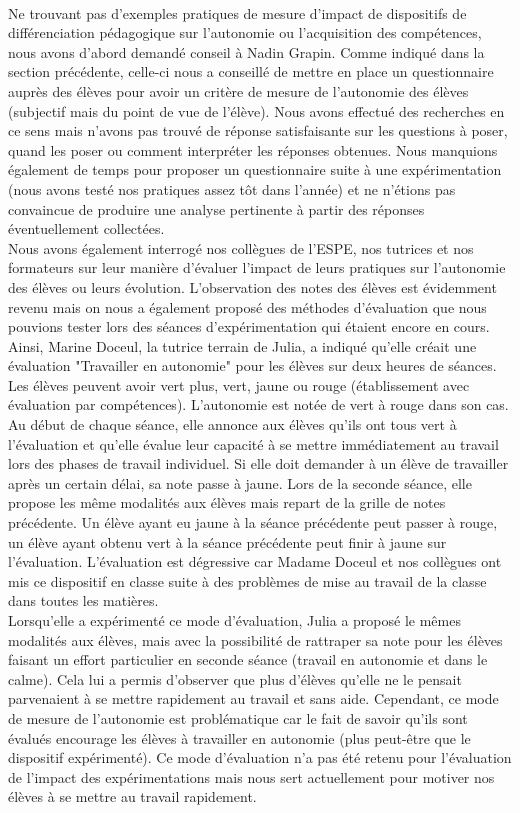 \paragraph*{} Ne trouvant pas d'exemples pratiques de mesure d'impact de dispositifs de différenciation pédagogique sur l'autonomie ou l'acquisition des compétences, nous avons d'abord demandé conseil à Nadin Grapin. Comme indiqué dans la section précédente, celle-ci nous a conseillé de mettre en place un questionnaire auprès des élèves pour avoir un critère de mesure  de l'autonomie des élèves (subjectif mais du point de vue de l'élève). Nous avons effectué des recherches en ce sens mais n'avons pas trouvé de réponse satisfaisante sur les questions à poser, quand les poser ou comment interpréter les réponses obtenues. Nous manquions également de temps pour proposer un questionnaire suite à une expérimentation (nous avons testé nos pratiques assez tôt dans l'année) et ne n'étions pas convaincue de produire une analyse pertinente à partir des réponses éventuellement collectées.\\
Nous avons également interrogé nos collègues de l'ESPE, nos tutrices et nos formateurs sur leur manière d'évaluer l'impact de leurs pratiques sur l'autonomie des élèves ou leurs évolution. L'observation des notes des élèves est évidemment revenu mais on nous a également proposé des méthodes d'évaluation que nous pouvions tester lors des séances d'expérimentation qui étaient encore en cours.
Ainsi, Marine Doceul, la tutrice terrain de Julia, a indiqué qu'elle créait une évaluation "Travailler en autonomie" pour les élèves sur deux heures de séances. Les élèves peuvent avoir vert plus, vert, jaune ou rouge (établissement avec évaluation par compétences). L'autonomie est notée de vert à rouge dans son cas. Au début de chaque séance, elle annonce aux élèves qu'ils ont tous vert à l'évaluation et qu'elle évalue leur capacité à se mettre immédiatement au travail lors des phases de travail individuel. Si elle doit demander à un élève de travailler après un certain délai, sa note passe à jaune. Lors de la seconde séance, elle propose les même modalités aux élèves mais repart de la grille de notes précédente. Un élève ayant eu jaune à la séance précédente peut passer à rouge, un élève ayant obtenu vert à la séance précédente peut finir à jaune sur l'évaluation. L'évaluation est dégressive car Madame Doceul et nos collègues ont mis ce dispositif en classe suite à des problèmes de mise au travail de la classe dans toutes les matières.\\
Lorsqu'elle a expérimenté ce mode d'évaluation, Julia a proposé le mêmes modalités aux élèves, mais avec la possibilité de rattraper sa note pour les élèves faisant un effort particulier en seconde séance (travail en autonomie et dans le calme). Cela lui a permis d'observer que plus d'élèves qu'elle ne le pensait parvenaient à se mettre rapidement au travail et sans aide. Cependant, ce mode de mesure de l'autonomie est problématique car le fait de savoir qu'ils sont évalués encourage les élèves à travailler en autonomie (plus peut-être que le dispositif expérimenté). Ce mode d'évaluation n'a pas été retenu pour l'évaluation de l'impact des expérimentations mais nous sert actuellement pour motiver nos élèves à se mettre au travail rapidement.\\
